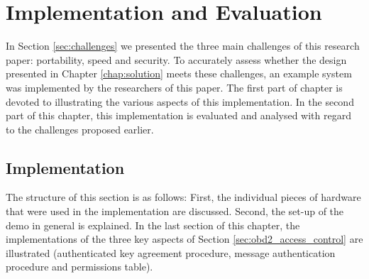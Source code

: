 
\chapter{Implementation and Evaluation}
\label{chap:implementation}

In Section \ref{sec:challenges} we presented the three main challenges of this research paper: portability, speed and security. To accurately assess whether the design presented in Chapter \ref{chap:solution} meets these challenges, an example system was implemented by the researchers of this paper. The first part of chapter is devoted to illustrating the various aspects of this implementation. In the second part of this chapter, this implementation is evaluated and analysed with regard to the challenges proposed earlier. 

\section{Implementation}
\label{sec:implementation}

The structure of this section is as follows: First, the individual pieces of hardware that were used in the implementation are discussed. Second, the set-up of the demo in general is explained. In the last section of this chapter, the implementations of the three key aspects of Section \ref{sec:obd2_access_control} are illustrated (authenticated key agreement procedure, message authentication procedure and permissions table).

